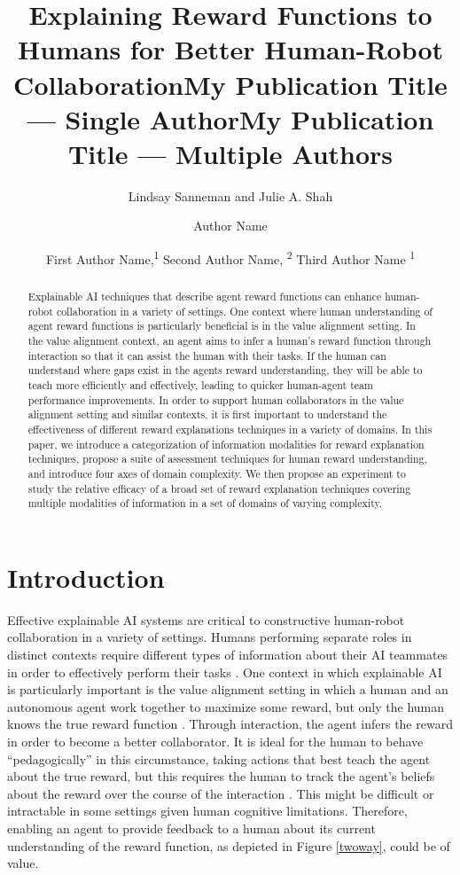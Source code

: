 \documentclass[letterpaper]{article} %
\title{Explaining Reward Functions to Humans for Better Human-Robot Collaboration}
\author{
Lindsay Sanneman and Julie A. Shah
\\
}
\title{My Publication Title --- Single Author}
\author {
Author Name \\
}
\title{My Publication Title --- Multiple Authors}
\author {
First Author Name,\textsuperscript{\rm 1}
Second Author Name, \textsuperscript{\rm 2}
Third Author Name \textsuperscript{\rm 1} \\
}
\begin{document}
\maketitle

\begin{abstract}
Explainable AI techniques that describe agent reward functions can enhance human-robot collaboration in a variety of settings. One context where human understanding of agent reward functions is particularly beneficial is in the value alignment setting.  In the value alignment context, an agent aims to infer a human's reward function through interaction so that it can assist the human with their tasks. If the human can understand where gaps exist in the agents reward understanding, they will be able to teach more efficiently and effectively, leading to quicker human-agent team performance improvements. In order to support human collaborators in the value alignment setting and similar contexts, it is first important to understand the effectiveness of different reward explanations techniques in a variety of domains. In this paper, we introduce a categorization of information modalities for reward explanation techniques, propose a suite of assessment techniques for human reward understanding, and introduce four axes of domain complexity. We then propose an experiment to study the relative efficacy of a broad set of reward explanation techniques covering multiple modalities of information in a set of domains of varying complexity.


\end{abstract}


\section{Introduction}

Effective explainable AI systems are critical to constructive human-robot collaboration in a variety of settings. Humans performing separate roles in distinct contexts require different types of information about their AI teammates in order to effectively perform their tasks \cite{sanneman2020situation}. One context in which explainable AI is particularly important is the value alignment setting in which a human and an autonomous agent work together to maximize some reward, but only the human knows the true reward function \cite{fisac2020pragmatic, hadfield2016cooperative}. Through interaction, the agent infers the reward in order to become a better collaborator. It is ideal for the human to behave ``pedagogically'' in this circumstance, taking actions that best teach the agent about the true reward,  but this requires the human to track the agent's beliefs about the reward over the course of the interaction \cite{fisac2020pragmatic}. This might be difficult or intractable in some settings given human cognitive limitations. Therefore, enabling an agent to provide feedback to a human about its current understanding of the reward function, as depicted in Figure \ref{twoway}, could be of value.
\end{document}

